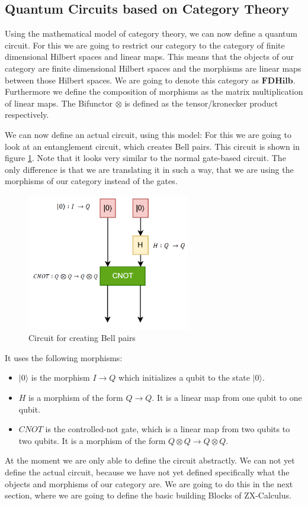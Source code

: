 \subsection{Quantum Circuits based on Category Theory}

Using the mathematical model of category theory, we can now define a quantum circuit. For this we are going to restrict our category to the category of finite dimensional Hilbert spaces and linear maps. This means that the objects of our category are finite dimensional Hilbert spaces and the morphisms are linear maps between those Hilbert spaces. We are going to denote this category as $\mathbf{FDHilb}$. Furthermore we define the composition of morphisms as the matrix multiplication of linear maps. The Bifunctor $\otimes$ is defined as the tensor/kronecker product respectively.

We can now define an actual circuit, using this model: For this we are going to look at an entanglement circuit, which creates Bell pairs. This circuit is shown in figure \ref{fig:bell_circuit}. Note that it looks very similar to the normal gate-based circuit. The only difference is that we are translating it in such a way, that we are using the morphisms of our category instead of the gates.

\begin{figure}
    \centering
    \includegraphics[height=6cm]{images/category-circuit.png}
    \caption{Circuit for creating Bell pairs}
    \label{fig:bell_circuit}
\end{figure}

It uses the following morphisms:

\begin{itemize}
    \item $|0\rangle$ is the morphism $I\rightarrow Q$ which initializes a qubit to the state $|0\rangle$.
    \item $H$ is a morphism of the form $Q\rightarrow Q$. It is a linear map from one qubit to one qubit.
    \item $CNOT$ is the controlled-not gate, which is a linear map from two qubits to two qubits. It is a morphism of the form $Q\otimes Q \rightarrow Q \otimes Q$.
\end{itemize}

At the moment we are only able to define the circuit abstractly. We can not yet define the actual circuit, because we have not yet defined specifically what the objects and morphisms of our category are. We are going to do this in the next section, where we are going to define the basic building Blocks of ZX-Calculus.